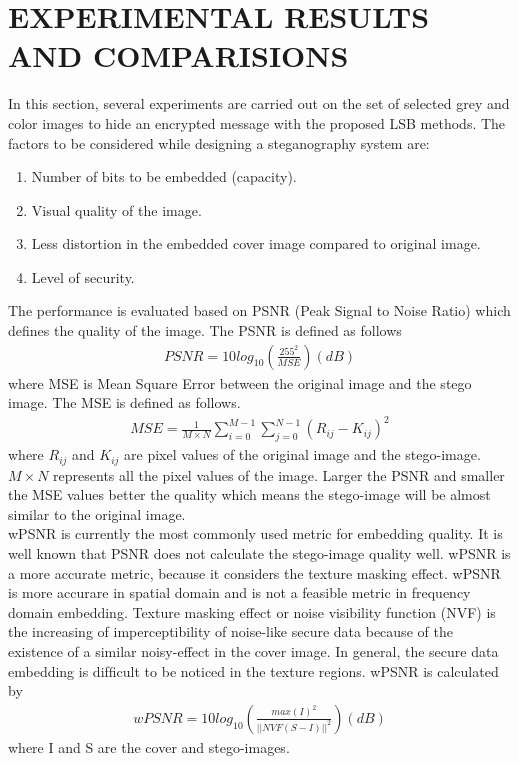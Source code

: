\documentclass[conference]{IEEEtran}
\begin{document}
\section{EXPERIMENTAL RESULTS AND COMPARISIONS}
\indent In this section, several experiments are carried out on the set of selected grey and color images to hide an encrypted message with the proposed LSB methods. The factors to be considered while designing a steganography system are:
\begin{enumerate}
	\item Number of bits to be embedded (capacity).
	\item Visual quality of the image.
	\item Less distortion in the embedded cover image compared to original image.
	\item Level of security.
\end{enumerate}
The performance is evaluated based on PSNR (Peak Signal to Noise Ratio) which defines the quality of the image. The PSNR is defined as follows
\begin{align}
PSNR = 10log_{10}(\frac{255^{2}}{MSE}) (dB)
\label{eq:psnr} 
\end{align}
where MSE is Mean Square Error between the original image and the stego image. The MSE is defined as follows.
\begin{align}
MSE = \frac{1}{M \times N}\sum_{i = 0}^{M - 1}\sum_{j = 0}^{N - 1}(R_{ij} - K_{ij})^{2}
\label{eq:mse} 
\end{align}
where \(R_{ij}\) and \(K_{ij}\) are pixel values of the original image and the stego-image. \(M \times N\) represents all the pixel values of the image. Larger the PSNR and smaller the MSE values better the quality which means the stego-image will be almost similar to the original image. \\
\indent wPSNR \cite{b9} is currently the most commonly used metric for embedding quality. It is well known that PSNR does not calculate the stego-image quality well. wPSNR is a more accurate metric, because it considers the texture masking effect. wPSNR is more accurare in spatial domain and is not a feasible metric in frequency domain embedding. Texture masking
effect or noise visibility function (NVF) is the increasing of imperceptibility of noise-like secure data because of the existence of a similar noisy-effect in the cover image. In
general, the secure data embedding is difﬁcult to be noticed in the texture regions. wPSNR is calculated by
\begin{align}
wPSNR = 10log_{10}(\frac{max(I)^{2}}{||NVF(S - I)||^{2}}) (dB)
\label{eq:wPSNR} 
\end{align}
where I and S are the cover and stego-images. \\[0.2cm]
\end{document}
